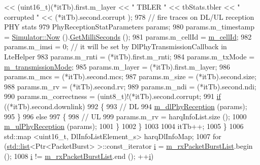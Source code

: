 \begin{DoxyCode}
       << (uint16\_t)(*itTb).first.m\_layer << \textcolor{stringliteral}{" TBLER "} << tbStats.tbler << \textcolor{stringliteral}{" corrupted "} << (*itTb).second.corrupt
      );
978           \textcolor{comment}{// fire traces on DL/UL reception PHY stats}
979           PhyReceptionStatParameters params;
980           params.m\_timestamp = \hyperlink{classns3_1_1Simulator_ac3178fa975b419f7875e7105be122800}{Simulator::Now} ().\hyperlink{classns3_1_1Time_aba3428a8b6c4c8d9014ce44145081f34}{GetMilliSeconds} ();
981           params.m\_cellId = \hyperlink{classns3_1_1LteSpectrumPhy_a996732fedbe320aedd9d2def1fc6e3c7}{m\_cellId};
982           params.m\_imsi = 0; \textcolor{comment}{// it will be set by DlPhyTransmissionCallback in LteHelper}
983           params.m\_rnti = (*itTb).first.m\_rnti;
984           params.m\_txMode = \hyperlink{classns3_1_1LteSpectrumPhy_a186ddcdf95b723c9f60a3a026c0df288}{m\_transmissionMode};
985           params.m\_layer =  (*itTb).first.m\_layer;
986           params.m\_mcs = (*itTb).second.mcs;
987           params.m\_size = (*itTb).second.size;
988           params.m\_rv = (*itTb).second.rv;
989           params.m\_ndi = (*itTb).second.ndi;
990           params.m\_correctness = (uint8\_t)!(*itTb).second.corrupt;
991           \hyperlink{loss__ITU1238_8m_a419d895abe1313c35fa353c93802647e}{if} ((*itTb).second.downlink)
992             \{
993               \textcolor{comment}{// DL}
994               \hyperlink{classns3_1_1LteSpectrumPhy_a49baf6d8358ac852b51545f752f82d67}{m\_dlPhyReception} (params);
995             \}
996           \textcolor{keywordflow}{else}
997             \{
998               \textcolor{comment}{// UL}
999               params.m\_rv = harqInfoList.size ();
1000               \hyperlink{classns3_1_1LteSpectrumPhy_ac86744120540d5bd999d11f3ac452de4}{m\_ulPhyReception} (params);
1001             \}
1002        \}
1003       
1004       itTb++;
1005     \}
1006     std::map <uint16\_t, DlInfoListElement\_s> harqDlInfoMap;
1007     \textcolor{keywordflow}{for} (\hyperlink{openflow-interface_8h_afd9bcfa176617760671b67580f536fa7}{std::list}<Ptr<PacketBurst> >::const\_iterator \hyperlink{bernuolliDistribution_8m_a6f6ccfcf58b31cb6412107d9d5281426}{i} = 
      \hyperlink{classns3_1_1LteSpectrumPhy_ae74163b2a9dd7db93b172204c833ce4f}{m\_rxPacketBurstList}.begin (); 
1008     \hyperlink{bernuolliDistribution_8m_a6f6ccfcf58b31cb6412107d9d5281426}{i} != \hyperlink{classns3_1_1LteSpectrumPhy_ae74163b2a9dd7db93b172204c833ce4f}{m\_rxPacketBurstList}.end (); ++\hyperlink{bernuolliDistribution_8m_a6f6ccfcf58b31cb6412107d9d5281426}{i})

\end{DoxyCode}
